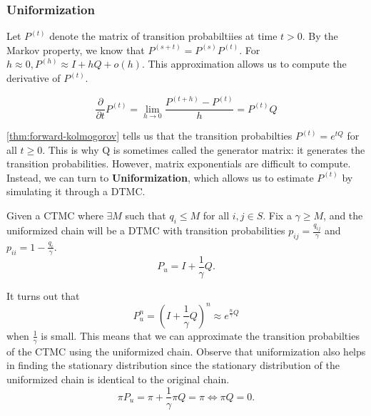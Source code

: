 \subsubsection{Uniformization}
Let $P^{(t)}$ denote the matrix of transition probabiltiies at time $t>0$.
By the Markov property, we know that $P^{(s+t)} = P^{(s)}P^{(t)}$.
For $h \approx 0, P^{(h)} \approx I + hQ + o(h)$. This approximation allows us to compute the derivative of $P^{(t)}$.
\begin{theorem}
	\[
		\frac{\partial}{\partial t}P^{(t)} = \lim_{h\to 0}\frac{P^{(t+h)} - P^{(t)}}{h} = P^{(t)}Q
	\]
	\label{thm:forward-kolmogorov}
\end{theorem}
\cref{thm:forward-kolmogorov} tells us that the transition probabilties $P^{(t)} = e^{tQ}$ for all $t \geq 0$.
This is why Q is sometimes called the generator matrix: it generates the transition probabilities.
However, matrix exponentials are difficult to compute. Instead, we can turn to \textbf{Uniformization}, which allows us to estimate $P^{(t)}$ by simulating it through a DTMC.
\begin{definition}
	Given a CTMC where $\exists M$ such that $q_{i} \leq M$ for all $i,j\in S$.
	Fix a $\gamma \geq M$, and the uniformized chain will be a DTMC with transition probabilities $p_{ij} = \frac{q_{ij}}{\gamma}$ and $p_{ii} = 1 - \frac{q_i}{\gamma}$.
	 \[
		P_u = I + \frac{1}{\gamma}Q.
	\]
	\label{defn:uniformization}
\end{definition}
It turns out that \[
	P_u^n = \left( I + \frac{1}{\gamma}Q \right)^n \approx e^{\frac{n}{\gamma}Q}
\]
when $\frac{1}{\gamma}$ is small.
This means that we can approximate the transition probabilties of the CTMC using the uniformized chain.
Observe that uniformization also helps in finding the stationary distribution since the stationary distribution of the uniformized chain is identical to the original chain.
\[
	\pi P_u = \pi + \frac{1}{\gamma}\pi Q = \pi \Leftrightarrow \pi Q = 0.
\]
